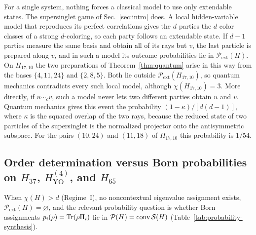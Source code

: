 \documentclass[aps,pra,reprint,superscriptaddress,longbibliography,nofootinbib,floatfix,10pt]{revtex4-2}
\theoremstyle{definition}\newtheorem{definition}[theorem]{Definition}
\theoremstyle{remark}\newtheorem{remark}[theorem]{Remark}
\newcommand{\Sc}{\mathcal S}\newcommand{\Cc}{\mathcal C}
\newcommand{\YO}{\mathrm{YO}}\newcommand{\ip}[2]{\langle #1,#2\rangle}
\begin{document}
For a single system, nothing forces a classical model to use only extendable states. The supersinglet game of Sec.~\ref{sec:intro} does. A local hidden-variable model that reproduces its perfect correlations gives the $d$ parties the $d$ color classes of a strong $d$-coloring, so each party follows an extendable state. If $d-1$ parties measure the same basis and obtain all of its rays but $v$, the last particle is prepared along $v$, and in such a model its outcome probabilities lie in $\mathcal P_{\mathrm{ext}}(H)$. On $H_{17,10}$ the two preparations of Theorem~\ref{thm:quantum} arise in this way from the bases $\{4,11,24\}$ and $\{2,8,5\}$. Both lie outside $\mathcal P_{\mathrm{ext}}(H_{17,10})$, so quantum mechanics contradicts every such local model, although $\chi(H_{17,10})=3$. More directly, if $u\sim_c v$, such a model never lets two different parties obtain $u$ and $v$. Quantum mechanics gives this event the probability $(1-\kappa)/[d(d-1)]$, where $\kappa$ is the squared overlap of the two rays, because the reduced state of two particles of the supersinglet is the normalized projector onto the antisymmetric subspace. For the pairs $(10,24)$ and $(11,18)$ of $H_{17,10}$ this probability is $1/54$.

\subsection{Order determination versus Born probabilities on \texorpdfstring{$H_{37}$, $H_{\YO}^{(4)}$, and $H_{65}$}{H37, HYO(4), and H65}}\label{h:sec:quantum-witness}\label{d:app:state-independence}

When $\chi(H)>d$ (Regime~I), no noncontextual eigenvalue assignment exists, $\mathcal P_{\mathrm{ext}}(H)=\varnothing$, and the relevant probability question is whether Born assignments $p_i(\rho)=\operatorname{Tr}(\rho\Pi_i)$ lie in $\mathcal P(H)=\conv\Sc(H)$ (Table~\ref{tab:probability-synthesis}).
\end{document}
